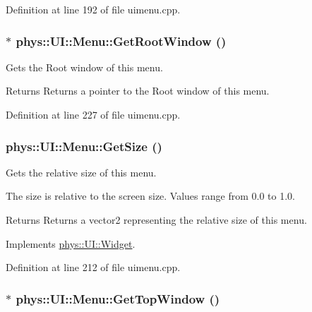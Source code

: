 Definition at line 192 of file uimenu.cpp.

\hypertarget{classphys_1_1UI_1_1Menu_a9926f44b122c804b68034a759ea4a967}{
\subsubsection[{GetRootWindow}]{ $\ast$ phys::UI::Menu::GetRootWindow ()}}
\label{d6/dd3/classphys_1_1UI_1_1Menu_a9926f44b122c804b68034a759ea4a967}


Gets the Root window of this menu. 

\begin{DoxyReturn}{Returns}
Returns a pointer to the Root window of this menu. 
\end{DoxyReturn}


Definition at line 227 of file uimenu.cpp.

\hypertarget{classphys_1_1UI_1_1Menu_a81781199a62bbe7c2e7693ef301223b4}{
\subsubsection[{GetSize}]{ phys::UI::Menu::GetSize ()}}
\label{d6/dd3/classphys_1_1UI_1_1Menu_a81781199a62bbe7c2e7693ef301223b4}


Gets the relative size of this menu. 

The size is relative to the screen size. Values range from 0.0 to 1.0. \begin{DoxyReturn}{Returns}
Returns a vector2 representing the relative size of this menu. 
\end{DoxyReturn}


Implements \hyperlink{classphys_1_1UI_1_1Widget_a07039c19e57de314147ce066417da0a2}{phys::UI::Widget}.



Definition at line 212 of file uimenu.cpp.

\hypertarget{classphys_1_1UI_1_1Menu_acf9a3bc3dd097093cce077cc60c14a6f}{
\subsubsection[{GetTopWindow}]{ $\ast$ phys::UI::Menu::GetTopWindow ()}}
\label{d6/dd3/classphys_1_1UI_1_1Menu_acf9a3bc3dd097093cce077cc60c14a6f}


